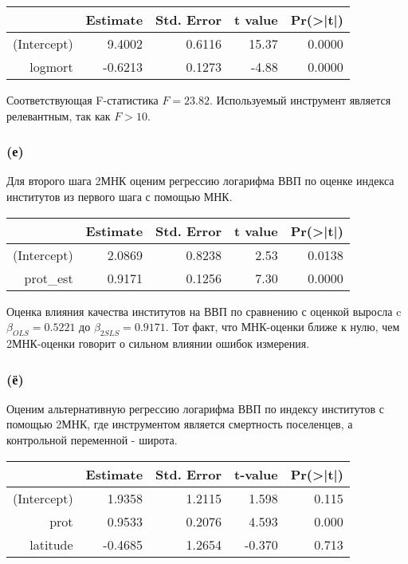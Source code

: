 \documentclass[a4paper,12pt]{article} %
\begin{document}
\begin{table}[h!]
	\centering
	\begin{tabular}{rrrrr}
		\hline
		& Estimate & Std. Error & t value & Pr(>|t|) \\ 
		\hline
		(Intercept) & 9.4002 & 0.6116 & 15.37 & 0.0000 \\ 
		logmort & -0.6213 & 0.1273 & -4.88 & 0.0000 \\ 
		\hline
	\end{tabular}
\end{table}

Соответствующая F-статистика $ F = 23.82 $. Используемый инструмент является  релевантным, так как $ F > 10 $.


\subsubsection*{(е)}	

Для второго шага 2МНК  оценим регрессию 
логарифма ВВП по оценке  индекса институтов из первого шага с помощью МНК.

\begin{table}[h!]
	\centering
	\begin{tabular}{rrrrr}
		\hline
		& Estimate & Std. Error & t value & Pr(>|t|) \\ 
		\hline
		(Intercept) & 2.0869 & 0.8238 & 2.53 & 0.0138 \\ 
		prot\_est & 0.9171 & 0.1256 & 7.30 & 0.0000 \\ 
		\hline
	\end{tabular}
\end{table}

Оценка влияния качества институтов на ВВП по
сравнению с оценкой выросла c $ \beta_{OLS} = 0.5221 $ до  $ \beta_{2SLS} = 0.9171 $. Тот факт, что МНК-оценки ближе к нулю, чем 2МНК-оценки говорит о сильном влиянии ошибок измерения.




\subsubsection*{(ё)}	

Оценим альтернативную регрессию логарифма ВВП по индексу институтов с помощью 2МНК, где инструментом является смертность  поселенцев, а контрольной переменной - широта.

\begin{table}[h!]
	\centering
	\begin{tabular}{rrrrr}
		\hline
		& Estimate & Std. Error & t-value & Pr(>|t|) \\ 
		\hline
		(Intercept) &   1.9358   &  1.2115  & 1.598  &  0.115  \\ 
		prot & 0.9533   &  0.2076 &  4.593 & 0.000 \\ 
		latitude &    -0.4685    & 1.2654 & -0.370  &  0.713
			\\ 
		\hline
	\end{tabular}
\end{table}	
\end{document}
